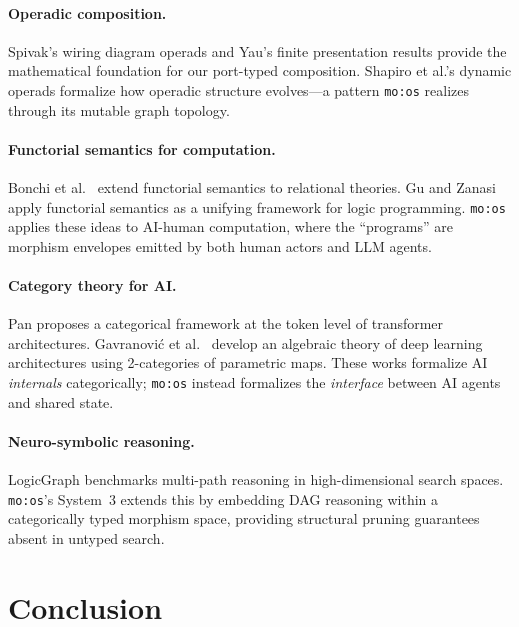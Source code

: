 \documentclass[submission,copyright,creativecommons]{eptcs}
\begin{document}
\paragraph{Operadic composition.}
Spivak's wiring diagram operads \cite{spivak2013,spivak2013operad} and Yau's
finite presentation results \cite{yau2018} provide the mathematical foundation
for our port-typed composition. Shapiro et al.'s dynamic operads
\cite{shapiro2022} formalize how operadic structure evolves---a pattern
\texttt{mo:os} realizes through its mutable graph topology.

\paragraph{Functorial semantics for computation.}
Bonchi et al.\ \cite{bonchi2017functorial} extend functorial semantics to
relational theories. Gu and Zanasi \cite{gu2021functorial} apply functorial
semantics as a unifying framework for logic programming. \texttt{mo:os}
applies these ideas to AI-human computation, where the ``programs'' are
morphism envelopes emitted by both human actors and LLM agents.

\paragraph{Category theory for AI.}
Pan \cite{pan2024token} proposes a categorical framework at the token level of
transformer architectures. Gavranovi{\'c} et al.\ \cite{gavranovic2024categorical}
develop an algebraic theory of deep learning architectures using 2-categories
of parametric maps. These works formalize AI \emph{internals} categorically;
\texttt{mo:os} instead formalizes the \emph{interface} between AI agents and
shared state.

\paragraph{Neuro-symbolic reasoning.}
LogicGraph \cite{logicgraph2025} benchmarks multi-path reasoning in
high-dimensional search spaces. \texttt{mo:os}'s System~3 extends this by
embedding DAG reasoning within a categorically typed morphism space, providing
structural pruning guarantees absent in untyped search.

\section{Conclusion}
\label{sec:conclusion}
\end{document}

